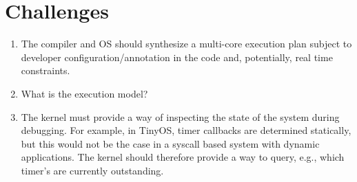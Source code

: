 \section{Challenges}
\begin{enumerate}
  \item The compiler and OS should synthesize a multi-core execution plan
  subject to developer configuration/annotation in the code and, potentially,
  real time constraints.

  \item What is the execution model?

  \item The kernel must provide a way of inspecting the state of the system
  during debugging. For example, in TinyOS, timer callbacks are determined
  statically, but this would not be the case in a syscall based system with
  dynamic applications. The kernel should therefore provide a way to query,
  e.g., which timer's are currently outstanding.

\end{enumerate}
